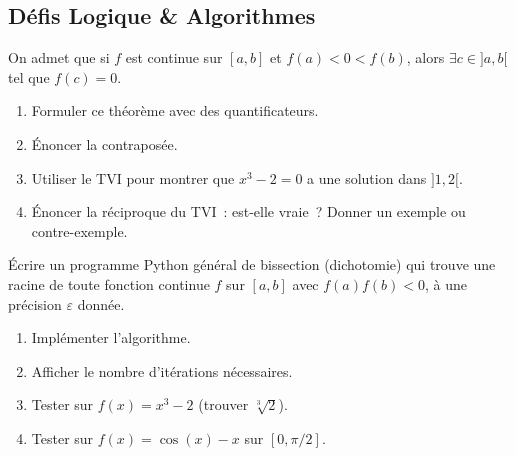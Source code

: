 \subsection*{D\'efis Logique \& Algorithmes}

\begin{challenge}
On admet que si $f$ est continue sur $[a,b]$ et $f(a)<0<f(b)$,
alors $\exists c\in]a,b[$ tel que $f(c)=0$.
\begin{enumerate}
  \item Formuler ce th\'eor\`eme avec des quantificateurs.
  \item \'Enoncer la contrapos\'ee.
  \item Utiliser le TVI pour montrer que $x^3-2=0$ a une solution dans $]1,2[$.
  \item \'Enoncer la r\'eciproque du TVI~: est-elle vraie~?
        Donner un exemple ou contre-exemple.
\end{enumerate}
\end{challenge}

\begin{challenge}
\'Ecrire un programme Python g\'en\'eral de bissection (dichotomie)
qui trouve une racine de toute fonction continue $f$ sur $[a,b]$
avec $f(a)f(b)<0$, \`a une pr\'ecision $\varepsilon$ donn\'ee.
\begin{enumerate}
  \item Impl\'ementer l'algorithme.
  \item Afficher le nombre d'it\'erations n\'ecessaires.
  \item Tester sur $f(x)=x^3-2$ (trouver $\sqrt[3]{2}$).
  \item Tester sur $f(x)=\cos(x)-x$ sur $[0,\pi/2]$.
\end{enumerate}
\end{challenge}

